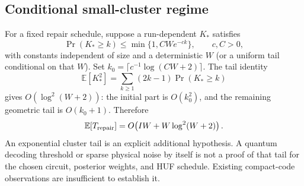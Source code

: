 \subsection{Conditional small-cluster regime}
For a fixed repair schedule, suppose a run-dependent $K_*$ satisfies
\[\Pr(K_*\ge k)\le\min\{1,CW e^{-ck}\},\qquad c,C>0,\]
with constants independent of size and a deterministic $W$ (or a uniform tail conditional on that $W$). Set $k_0=\lceil c^{-1}\log(CW+2)\rceil$. The tail identity
\[\mathbb E[K_*^2]=\sum_{k\ge1}(2k-1)\Pr(K_*\ge k)\]
gives $O(\log^2(W+2))$: the initial part is $O(k_0^2)$, and the remaining geometric tail is $O(k_0+1)$. Therefore
\[\mathbb E[T_{\rm repair}]=O\!\left(IW+W\log^2(W+2)\right).\]
An exponential cluster tail is an explicit additional hypothesis. A quantum decoding threshold or sparse physical noise by itself is not a proof of that tail for the chosen circuit, posterior weights, and HUF schedule. Existing compact-code observations are insufficient to establish it.

